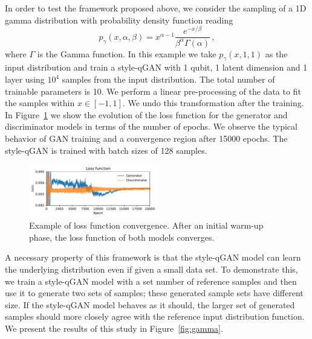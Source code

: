 \documentclass[twocolumn,preprintnumbers,superscriptaddress]{revtex4-2}
\begin{document}
In order to test the framework proposed above, we
consider the sampling of a 1D gamma distribution with probability density
function reading
\begin{equation}
  p_\gamma (x, \alpha, \beta) = x^{\alpha-1} \frac{e^{-x/\beta}}{\beta^\alpha \Gamma(\alpha)}\,,
\end{equation}
where $\Gamma$ is the Gamma function. In this example we take $p_\gamma (x, 1,
1)$ as the input distribution and train a style-qGAN with 1 qubit, 1 latent dimension and
1 layer using $10^4$ samples from the input distribution. The total number of trainable parameters is 10. We perform a linear pre-processing of the data to fit the samples within $x \in [-1, 1]$. We undo this transformation after the training.
%
In Figure~\ref{fig:loss} we show the evolution of the loss function for the
generator and discriminator models in terms of the number of epochs. We observe the
typical behavior of GAN training and a convergence region after 15000 epochs.
%
The style-qGAN is trained with batch sizes of 128 samples.

\begin{figure}
  \includegraphics[width=0.5\textwidth]{plots/1Dgamma/1Dgamma_loss.pdf}
  \caption{\label{fig:loss}Example of loss function convergence. After an
  initial warm-up phase, the loss function of both models converges.}
\end{figure}

A necessary property of this framework is that the style-qGAN model can learn the underlying distribution even if given a small data set. To demonstrate this, we train a style-qGAN model with a set number of reference samples and then use it to generate two sets of samples; these generated sample sets have different size. If the style-qGAN model behaves as it should, the larger set of generated samples should more closely agree with the reference input distribution function. We present the results of this study in Figure~\ref{fig:gamma}.
  
\end{document}
